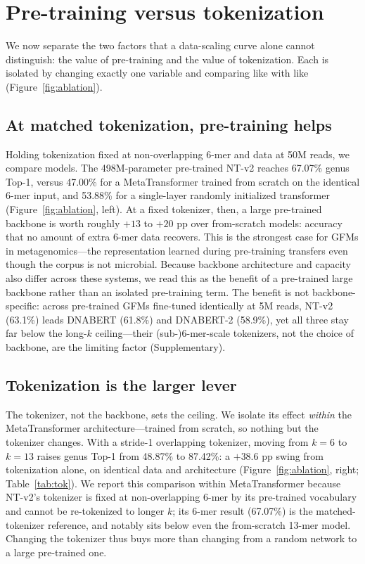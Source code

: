 \section{Pre-training versus tokenization}
\label{sec:decomp}

We now separate the two factors that a data-scaling curve alone cannot
distinguish: the value of pre-training and the value of tokenization. Each is
isolated by changing exactly one variable and comparing like with like
(Figure~\ref{fig:ablation}).

\subsection{At matched tokenization, pre-training helps}

Holding tokenization fixed at non-overlapping 6-mer and data at 50M reads, we
compare models. The 498M-parameter pre-trained NT-v2 reaches 67.07\% genus
Top-1, versus 47.00\% for a MetaTransformer trained from scratch on the identical
6-mer input, and 53.88\% for a single-layer randomly initialized transformer
(Figure~\ref{fig:ablation}, left). At a fixed tokenizer, then, a large
pre-trained backbone is worth roughly $+13$ to $+20$ pp over from-scratch models:
accuracy that no amount of extra 6-mer data recovers. This is the strongest case
for GFMs in metagenomics---the representation learned during pre-training
transfers even though the corpus is not microbial. Because backbone architecture
and capacity also differ across these systems, we read this as the benefit of a
pre-trained large backbone rather than an isolated pre-training term. The benefit
is not backbone-specific: across pre-trained GFMs fine-tuned identically at 5M
reads, NT-v2 (63.1\%) leads DNABERT (61.8\%) and DNABERT-2 (58.9\%), yet all
three stay far below the long-$k$ ceiling---their (sub-)6-mer-scale tokenizers,
not the choice of backbone, are the limiting factor (Supplementary).

\subsection{Tokenization is the larger lever}

The tokenizer, not the backbone, sets the ceiling. We isolate its effect
\emph{within} the MetaTransformer architecture---trained from scratch, so nothing
but the tokenizer changes. With a stride-1 overlapping tokenizer, moving from
$k=6$ to $k=13$ raises genus Top-1 from 48.87\% to 87.42\%: a $+38.6$ pp swing
from tokenization alone, on identical data and architecture
(Figure~\ref{fig:ablation}, right; Table~\ref{tab:tok}). We report this
comparison within MetaTransformer because NT-v2's tokenizer is fixed at
non-overlapping 6-mer by its pre-trained vocabulary and cannot be re-tokenized to
longer $k$; its 6-mer result (67.07\%) is the matched-tokenizer reference, and
notably sits below even the from-scratch 13-mer model. Changing the tokenizer
thus buys more than changing from a random network to a large pre-trained one.

